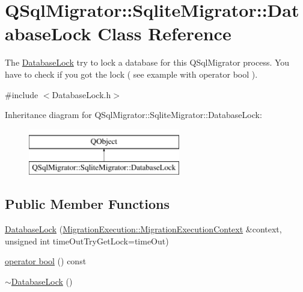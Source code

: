 \hypertarget{class_q_sql_migrator_1_1_sqlite_migrator_1_1_database_lock}{}\section{Q\+Sql\+Migrator\+:\+:Sqlite\+Migrator\+:\+:Database\+Lock Class Reference}
\label{class_q_sql_migrator_1_1_sqlite_migrator_1_1_database_lock}


The \hyperlink{class_q_sql_migrator_1_1_sqlite_migrator_1_1_database_lock}{Database\+Lock} try to lock a database for this Q\+Sql\+Migrator process. You have to check if you got the lock ( see example with operator bool ).  




{\ttfamily \#include $<$Database\+Lock.\+h$>$}

Inheritance diagram for Q\+Sql\+Migrator\+:\+:Sqlite\+Migrator\+:\+:Database\+Lock\+:\begin{figure}[H]
\begin{center}
\leavevmode
\includegraphics[height=2.000000cm]{class_q_sql_migrator_1_1_sqlite_migrator_1_1_database_lock}
\end{center}
\end{figure}
\subsection*{Public Member Functions}
\begin{DoxyCompactItemize}
\item 
\hyperlink{class_q_sql_migrator_1_1_sqlite_migrator_1_1_database_lock_abbbe7edb1c77fc3ed9a6a431b4d7cdcc}{Database\+Lock} (\hyperlink{class_q_sql_migrator_1_1_migration_execution_1_1_migration_execution_context}{Migration\+Execution\+::\+Migration\+Execution\+Context} \&context, unsigned int time\+Out\+Try\+Get\+Lock=time\+Out)
\item 
\hyperlink{class_q_sql_migrator_1_1_sqlite_migrator_1_1_database_lock_a42a41f79c57bea1253bea7794ad788ca}{operator bool} () const
\item 
\hyperlink{class_q_sql_migrator_1_1_sqlite_migrator_1_1_database_lock_ae8acecfef4f54eee37becd846fcff87a}{$\sim$\+Database\+Lock} ()
\end{DoxyCompactItemize}
